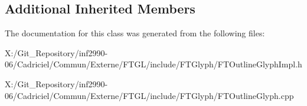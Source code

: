 \subsection*{Additional Inherited Members}


The documentation for this class was generated from the following files\-:\begin{DoxyCompactItemize}
\item 
X\-:/\-Git\-\_\-\-Repository/inf2990-\/06/\-Cadriciel/\-Commun/\-Externe/\-F\-T\-G\-L/include/\-F\-T\-Glyph/F\-T\-Outline\-Glyph\-Impl.\-h\item 
X\-:/\-Git\-\_\-\-Repository/inf2990-\/06/\-Cadriciel/\-Commun/\-Externe/\-F\-T\-G\-L/include/\-F\-T\-Glyph/F\-T\-Outline\-Glyph.\-cpp\end{DoxyCompactItemize}
